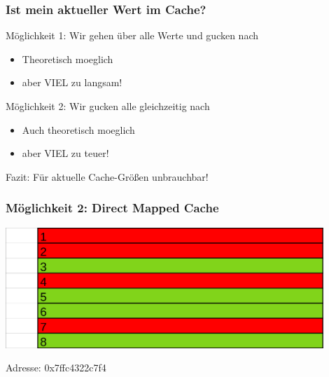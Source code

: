 \documentclass{beamer}
\begin{document}
%
\begin{frame}
\frametitle{Ist mein aktueller Wert im Cache?}
\begin{block}{M\"oglichkeit 1: Wir gehen \"uber alle Werte und gucken nach}
\begin{itemize}
\pause
\item Theoretisch moeglich
\pause
\item aber VIEL zu langsam!
\end{itemize}
\end{block}
\pause
\begin{block}{M\"oglichkeit 2: Wir gucken alle gleichzeitig nach}
\begin{itemize}
\pause
\item Auch theoretisch moeglich
\pause
\item aber VIEL zu teuer!
\end{itemize}
\pause
\end{block}
\begin{block}{Fazit: F\"ur aktuelle Cache-Gr\"o\ss{}en unbrauchbar!}
\end{block}
\end{frame}

\begin{frame}
\frametitle{M\"oglichkeit 2: Direct Mapped Cache}
\centerline{\includegraphics[width=12cm]{fac1.png}}
Adresse: 0x7ffc4322c7f4
\end{frame}
\end{document}
